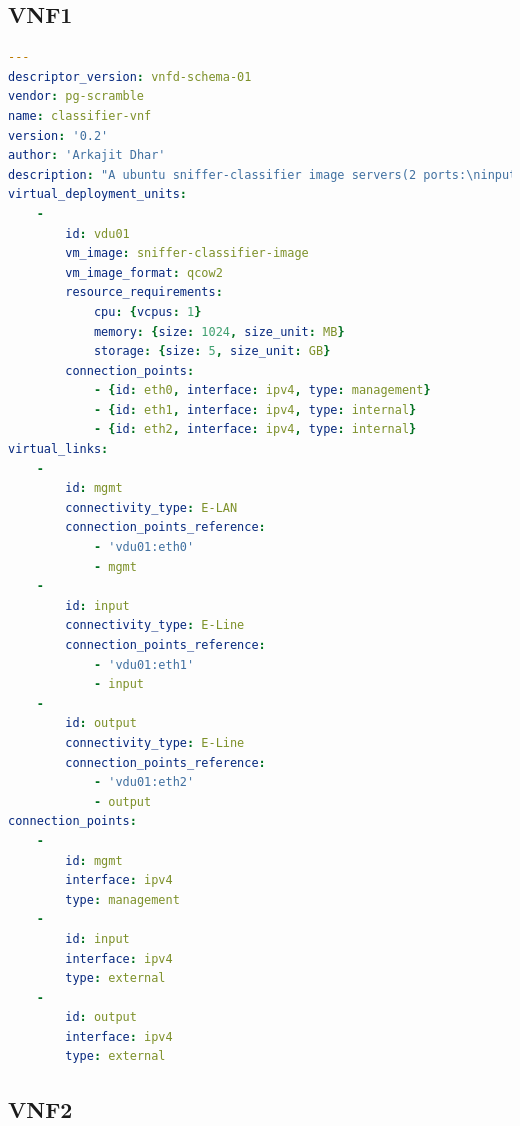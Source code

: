 \subsection{VNF1}

\begin{lstlisting}[language=yaml,caption=Classifier VNFD]
---
descriptor_version: vnfd-schema-01
vendor: pg-scramble
name: classifier-vnf
version: '0.2'
author: 'Arkajit Dhar'
description: "A ubuntu sniffer-classifier image servers(2 ports:\ninput+output) in a single VNF"
virtual_deployment_units:
    -
        id: vdu01
        vm_image: sniffer-classifier-image
        vm_image_format: qcow2
        resource_requirements:
            cpu: {vcpus: 1}
            memory: {size: 1024, size_unit: MB}
            storage: {size: 5, size_unit: GB}
        connection_points:
            - {id: eth0, interface: ipv4, type: management}
            - {id: eth1, interface: ipv4, type: internal}
            - {id: eth2, interface: ipv4, type: internal}
virtual_links:
    -
        id: mgmt
        connectivity_type: E-LAN
        connection_points_reference:
            - 'vdu01:eth0'
            - mgmt
    -
        id: input
        connectivity_type: E-Line
        connection_points_reference:
            - 'vdu01:eth1'
            - input
    -
        id: output
        connectivity_type: E-Line
        connection_points_reference:
            - 'vdu01:eth2'
            - output
connection_points:
    -
        id: mgmt
        interface: ipv4
        type: management
    -
        id: input
        interface: ipv4
        type: external
    -
        id: output
        interface: ipv4
        type: external
\end{lstlisting}

\subsection{VNF2}

